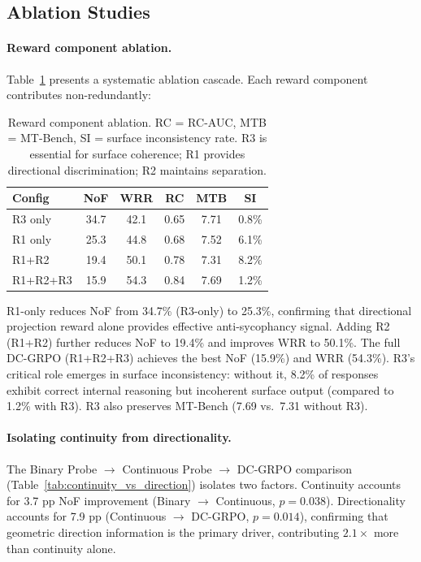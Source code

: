 \documentclass[11pt,a4paper]{article}
\begin{document}
\subsection{Ablation Studies}
\label{sec:ablation}

\paragraph{Reward component ablation.}
Table~\ref{tab:ablation_components} presents a systematic ablation cascade. Each reward component contributes non-redundantly:

\begin{table}[t]
\centering
\small
\begin{tabular}{lccccc}
\toprule
\textbf{Config} & \textbf{NoF} & \textbf{WRR} & \textbf{RC} & \textbf{MTB} & \textbf{SI} \\
\midrule
R3 only & 34.7 & 42.1 & 0.65 & 7.71 & 0.8\% \\
R1 only & 25.3 & 44.8 & 0.68 & 7.52 & 6.1\% \\
R1+R2 & 19.4 & 50.1 & 0.78 & 7.31 & 8.2\% \\
R1+R2+R3 & 15.9 & 54.3 & 0.84 & 7.69 & 1.2\% \\
\bottomrule
\end{tabular}
\caption{Reward component ablation. RC = RC-AUC, MTB = MT-Bench, SI = surface inconsistency rate. R3 is essential for surface coherence; R1 provides directional discrimination; R2 maintains separation.}
\label{tab:ablation_components}
\end{table}

R1-only reduces NoF from 34.7\% (R3-only) to 25.3\%, confirming that directional projection reward alone provides effective anti-sycophancy signal. Adding R2 (R1+R2) further reduces NoF to 19.4\% and improves WRR to 50.1\%. The full DC-GRPO (R1+R2+R3) achieves the best NoF (15.9\%) and WRR (54.3\%). R3's critical role emerges in surface inconsistency: without it, 8.2\% of responses exhibit correct internal reasoning but incoherent surface output (compared to 1.2\% with R3). R3 also preserves MT-Bench (7.69 vs.\ 7.31 without R3).

\paragraph{Isolating continuity from directionality.}
The Binary Probe $\to$ Continuous Probe $\to$ DC-GRPO comparison (Table~\ref{tab:continuity_vs_direction}) isolates two factors. Continuity accounts for 3.7 pp NoF improvement (Binary $\to$ Continuous, $p = 0.038$). Directionality accounts for 7.9 pp (Continuous $\to$ DC-GRPO, $p = 0.014$), confirming that geometric direction information is the primary driver, contributing $2.1\times$ more than continuity alone.
\end{document}
